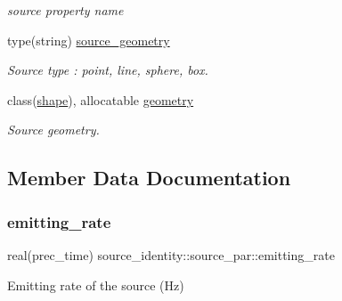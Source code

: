 \begin{DoxyCompactItemize}
\begin{DoxyCompactList}\small\item\em source property name \end{DoxyCompactList}\item 
type(string) \mbox{\hyperlink{structsource__identity_1_1source__par_a088f264b78200deb737b873025837ec6}{source\+\_\+geometry}}
\begin{DoxyCompactList}\small\item\em Source type \+: \textquotesingle{}point\textquotesingle{}, \textquotesingle{}line\textquotesingle{}, \textquotesingle{}sphere\textquotesingle{}, \textquotesingle{}box\textquotesingle{}. \end{DoxyCompactList}\item 
class(\mbox{\hyperlink{structgeometry_1_1shape}{shape}}), allocatable \mbox{\hyperlink{structsource__identity_1_1source__par_a96d4d1aebbc4cf365220f0bf0eabca97}{geometry}}
\begin{DoxyCompactList}\small\item\em Source geometry. \end{DoxyCompactList}\end{DoxyCompactItemize}


\subsection{Member Data Documentation}
\mbox{\label{structsource__identity_1_1source__par_a746a02960ffcba9f699ae45fa55dd8b4}} 
\subsubsection{\texorpdfstring{emitting\+\_\+rate}{emitting\_rate}}
{\footnotesize\ttfamily real(prec\+\_\+time) source\+\_\+identity\+::source\+\_\+par\+::emitting\+\_\+rate\hspace{0.3cm}{\ttfamily [private]}}



Emitting rate of the source (Hz) 

\mbox{\label{structsource__identity_1_1source__par_a96d4d1aebbc4cf365220f0bf0eabca97}} 
